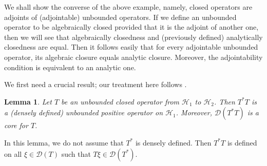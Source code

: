 \documentclass[12pt,b5paper,notitlepage]{article}
\theoremstyle{definition}
\theoremstyle{plain}
\newtheorem{lm}[df]{Lemma}
\newcommand{\mc}{\mathcal}
\newcommand{\Dom}{\scr D}
\newcommand{\scr}{\mathscr}
\numberwithin{equation}{section}
\begin{document}
We shall show the converse of the above example, namely, closed operators are adjoints of (adjointable) unbounded operators. If we define an unbounded operator to be algebraically closed provided that it is the adjoint of another one, then we will see that algebraically closedness and (previously defined) analytically closedness are equal. Then it follows easily that for every adjointable unbounded operator, its algebraic closure equals analytic closure. Moreover, the adjointability condition is equivalent to an analytic one.


We first need a crucial result; our treatment here follows \cite[Rem. 2.7.7]{Kad}.

\begin{lm}\label{lb16}
Let $T$ be an unbounded closed operator from $\mc H_1$ to $\mc H_2$. Then $T^*T$ is a (densely defined) unbounded positive operator on $\mc H_1$. Moreover, $\Dom(T^*T)$ is a core for $T$.
\end{lm}


In this lemma, we do not assume that $T^*$ is densely defined. Then $T^*T$ is defined on all $\xi\in\Dom(T)$ such that $T\xi\in\Dom(T^*)$.
\end{document}

